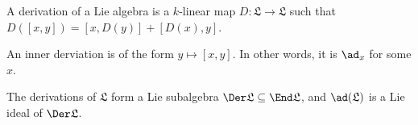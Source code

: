 A derivation of a Lie algebra is a $k$-linear map $D\colon \mathfrak{L}\to \mathfrak{L}$
such that $D([x, y]) = [x, D(y)] + [D(x), y]$.

An inner derviation is of the form $y\mapsto [x, y]$. In other words, it is
$\ad_x$ for some $x$.

The derivations of $\mathfrak{L}$ form a Lie subalgebra $\Der \mathfrak{L} \subseteq \End \mathfrak{L}$,
and $\ad(\mathfrak{L})$ is a Lie ideal of $\Der \mathfrak{L}$.
